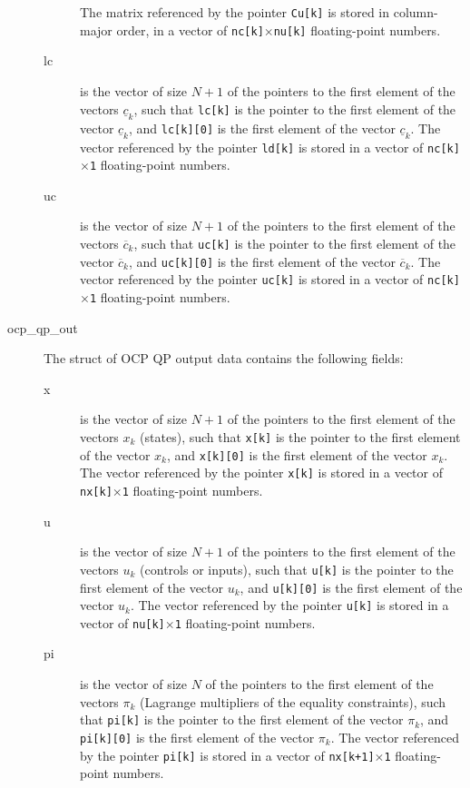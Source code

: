 \documentclass{report}
\begin{document}
\begin{description}
\begin{description}
		The matrix referenced by the pointer \texttt{Cu[k]} is stored in column-major order, in a vector of \texttt{nc[k]$\times$nu[k]} floating-point numbers.
		\item[lc] is the vector of size $N+1$ of the pointers to the first element of the vectors $\underline c_k$, such that \texttt{lc[k]} is the pointer to the first element of the vector $\underline c_k$, and \texttt{lc[k][0]} is the first element of the vector $\underline c_k$.
		The vector referenced by the pointer \texttt{ld[k]} is stored in a vector of \texttt{nc[k]$\times$1} floating-point numbers.
		\item[uc] is the vector of size $N+1$ of the pointers to the first element of the vectors $\overline c_k$, such that \texttt{uc[k]} is the pointer to the first element of the vector $\overline c_k$, and \texttt{uc[k][0]} is the first element of the vector $\overline c_k$.
		The vector referenced by the pointer \texttt{uc[k]} is stored in a vector of \texttt{nc[k]$\times$1} floating-point numbers.
	\end{description}
	\item[ocp\_qp\_out] The struct of OCP QP output data contains the following fields:
	\begin{description}
		\item[x] is the vector of size $N+1$ of the pointers to the first element of the vectors $x_k$ (states), such that \texttt{x[k]} is the pointer to the first element of the vector $x_k$, and \texttt{x[k][0]} is the first element of the vector $x_k$.
		The vector referenced by the pointer \texttt{x[k]} is stored in a vector of \texttt{nx[k]$\times$1} floating-point numbers.
		\item[u] is the vector of size $N+1$ of the pointers to the first element of the vectors $u_k$ (controls or inputs), such that \texttt{u[k]} is the pointer to the first element of the vector $u_k$, and \texttt{u[k][0]} is the first element of the vector $u_k$.
		The vector referenced by the pointer \texttt{u[k]} is stored in a vector of \texttt{nu[k]$\times$1} floating-point numbers.
		\item[pi] is the vector of size $N$ of the pointers to the first element of the vectors $\pi_k$ (Lagrange multipliers of the equality constraints), such that \texttt{pi[k]} is the pointer to the first element of the vector $\pi_k$, and \texttt{pi[k][0]} is the first element of the vector $\pi_k$.
		The vector referenced by the pointer \texttt{pi[k]} is stored in a vector of \texttt{nx[k+1]$\times$1} floating-point numbers.

\end{description}
\end{description}
\end{document}
